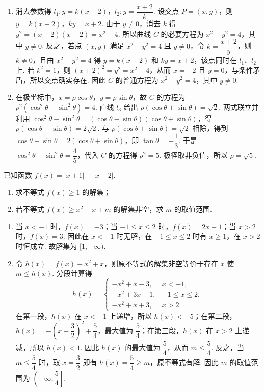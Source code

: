 \begin{solution}
\begin{enumerate}
\item 消去参数得 \(l_1:y=k(x-2)\)，\(l_2:y=\dfrac{x+2}{k}\). 设交点 \(P=(x,y)\)，则 \(y=k(x-2)\)，\(ky=x+2\). 由于 \(y\ne0\)，消去 \(k\) 得 \(y^2=(x-2)(x+2)=x^2-4\).
所以曲线 \(C\) 的必要方程为 \(x^2-y^2=4\)，其中 \(y\ne0\). 反之，若点 \((x,y)\) 满足 \(x^2-y^2=4\) 且 \(y\ne0\)，令 \(k=\dfrac{x+2}{y}\)，则 \(k\ne0\)，且由 \(x^2-y^2=4\) 得 \(y=k(x-2)\) 和 \(ky=x+2\)，该点同时在 \(l_1\)、\(l_2\) 上. 若 \(k^2=1\)，则 \((x+2)^2=y^2=x^2-4\)，从而 \(x=-2\) 且 \(y=0\)，与条件矛盾，所以交点确实存在. 因此 \(C\) 的普通方程为 \(x^2-y^2=4\)，其中 \(y\ne0\).
\item 在极坐标中，\(x=\rho\cos\theta\)，\(y=\rho\sin\theta\)，故 \(C\) 的方程为 \(\rho^2(\cos^2\theta-\sin^2\theta)=4\). 直线 \(l_3\) 给出 \(\rho(\cos\theta+\sin\theta)=\sqrt2\). 两式联立并利用 \(\cos^2\theta-\sin^2\theta=(\cos\theta-\sin\theta)(\cos\theta+\sin\theta)\)，得 \(\rho(\cos\theta-\sin\theta)=2\sqrt2\).
与 \(\rho(\cos\theta+\sin\theta)=\sqrt2\) 相除，得到 \(\cos\theta-\sin\theta=2(\cos\theta+\sin\theta)\)，即 \(\tan\theta=-\dfrac13\). 于是 \(\cos^2\theta-\sin^2\theta=\dfrac45\)，代入 \(C\) 的方程得 \(\rho^2=5\). 极径取非负值，所以 \(\rho=\sqrt5\).
\end{enumerate}
\end{solution}

\begin{problem}
已知函数 \(f(x)=\lvert x+1\rvert-\lvert x-2\rvert\).

\begin{enumerate}
\item 求不等式 \(f(x)\ge 1\) 的解集；
\item 若不等式 \(f(x)\ge x^2-x+m\) 的解集非空，求 \(m\) 的取值范围.
\end{enumerate}
\end{problem}

\begin{solution}
\begin{enumerate}
\item 当 \(x<-1\) 时，\(f(x)=-3\)；当 \(-1\le x\le2\) 时，\(f(x)=2x-1\)；当 \(x>2\) 时，\(f(x)=3\). 因此在 \(x<-1\) 时无解，在 \(-1\le x\le2\) 时有 \(x\ge1\)，在 \(x>2\) 时恒成立. 故解集为 \([1,+\infty)\).
\item 令 \(h(x)=f(x)-x^2+x\)，则原不等式的解集非空等价于存在 \(x\) 使 \(m\le h(x)\). 分段计算得
\[
h(x)=\begin{cases}
-x^2+x-3,&x<-1,\\
-x^2+3x-1,&-1\le x\le2,\\
-x^2+x+3,&x>2.
\end{cases}
\]
在第一段，\(h(x)\) 在 \(x<-1\) 上递增，所以 \(h(x)<-5\)；在第二段，\(h(x)=-\left(x-\dfrac32\right)^2+\dfrac54\)，最大值为 \(\dfrac54\)；在第三段，\(h(x)\) 在 \(x>2\) 上递减，所以 \(h(x)<1\). 因此 \(h(x)\) 的最大值为 \(\dfrac54\)，从而 \(m\le\dfrac54\). 反之，当 \(m\le\dfrac54\) 时，取 \(x=\dfrac32\) 即有 \(h(x)=\dfrac54\ge m\)，原不等式有解. 因此 \(m\) 的取值范围为 \(\left(-\infty,\dfrac54\right]\).
\end{enumerate}
\end{solution}
